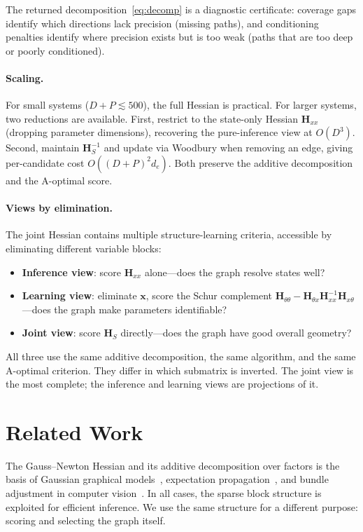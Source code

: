 \documentclass[11pt, a4paper]{article}
\newcommand{\bx}{\bm{x}}
\begin{document}
The returned decomposition~\eqref{eq:decomp} is a diagnostic certificate: coverage gaps identify which directions lack precision (missing paths), and conditioning penalties identify where precision exists but is too weak (paths that are too deep or poorly conditioned).

\paragraph{Scaling.}
For small systems ($D + P \lesssim 500$), the full Hessian is practical.
For larger systems, two reductions are available.
First, restrict to the state-only Hessian $\bm{H}_{xx}$ (dropping parameter dimensions), recovering the pure-inference view at $O(D^3)$.
Second, maintain $\bm{H}_S^{-1}$ and update via Woodbury when removing an edge, giving per-candidate cost $O((D{+}P)^2 d_e)$.
Both preserve the additive decomposition and the A-optimal score.

\paragraph{Views by elimination.}
The joint Hessian contains multiple structure-learning criteria, accessible by eliminating different variable blocks:
\begin{itemize}
    \item \textbf{Inference view}: score $\bm{H}_{xx}$ alone---does the graph resolve states well?
    \item \textbf{Learning view}: eliminate $\bx$, score the Schur complement $\bm{H}_{\theta\theta} - \bm{H}_{\theta x}\bm{H}_{xx}^{-1}\bm{H}_{x\theta}$---does the graph make parameters identifiable?
    \item \textbf{Joint view}: score $\bm{H}_S$ directly---does the graph have good overall geometry?
\end{itemize}
All three use the same additive decomposition, the same algorithm, and the same A-optimal criterion.
They differ in which submatrix is inverted.
The joint view is the most complete; the inference and learning views are projections of it.

\section{Related Work}

The Gauss--Newton Hessian and its additive decomposition over factors is the basis of Gaussian graphical models~\citep{lauritzen1996graphical,koller2009pgm}, expectation propagation~\citep{minka2001ep}, and bundle adjustment in computer vision~\citep{triggs2000bundle}.
In all cases, the sparse block structure is exploited for efficient inference.
We use the same structure for a different purpose: scoring and selecting the graph itself.
\end{document}
